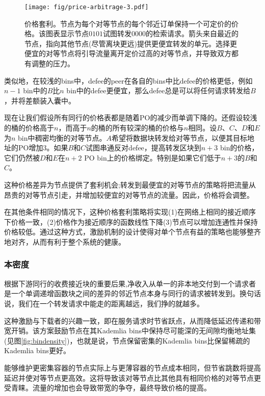 \begin{figure}[htbp]
   \centering
   \texttt{[image: fig/price-arbitrage-3.pdf]}
    \caption[价格套利\statusgreen]{价格套利。节点为每个对等节点的每个邻近订单保持一个可定价的价格。该图表显示节点$0101$试图转发$0000$的检索请求。箭头来自最近的节点，指向其他节点(尽管离块更远)提供更便宜转发的单元。选择更便宜的对等节点将引导流量离开定价过高的对等节点，并导致双方都有调整的压力。}
   \label{fig:price-arbitrage}
\end{figure}
 


类似地，在较浅的bins中，defee的peer在各自的bins中比defee的价格更低，例如$n-1$ bin中的$B$比$n$ bin中的defee更便宜，那么defee总是可以将任何请求转发给$B$，并将差额装入囊中。

现在让我们假设所有同行的价格表都是随着PO的减少而单调下降的。还假设较浅的桶的价格高于$n$，而高于$n$的桶的所有较深的桶的价格与$n$相同。设$B$、$C$、$D$和$E$为$n$ bin中稠密均衡的对等节点。$A$希望将数据块转发给对等节点，以便其目标地址的PO增加3。如果$B$和$C$试图串通反对defee，提高转发区块到$n+3$ bin的价格，它们仍然被$D$和$E$在$n+2$ PO bin上的价格绑定。特别是如果它们低于$n+3$的$B$和$C$。

这种价格差异为节点提供了套利机会;转发到最便宜的对等节点的策略将把流量从昂贵的对等节点引走，并增加较便宜的对等节点的流量。因此，价格将会调整。

在其他条件相同的情况下，这种价格套利策略将实现(1)在网络上相同的接近顺序下价格一致，(2)价格作为接近顺序的函数线性下降(3)节点可以增加连通性并保持价格较低。通过这种方式，激励机制的设计使得对单个节点有益的策略也能够整齐地对齐，从而有利于整个系统的健康。


\subsubsection{本密度}

根据下游同行的收费接近块的重要后果,净收入从单一的非本地交付到一个请求者是一个单调递增函数块之间的差异的邻近节点本身与同行的请求被转发到。换句话说，我们在一个转发请求中能走的距离越远，我们挣的就越多。

这种激励与下载者的兴趣一致，即在服务请求时节省跃点，从而降低延迟传递和带宽开销。该方案鼓励节点在其Kademlia bins中保持尽可能深的无间隙均衡地址集(见图\ref{fig:bindensity})，也就是说，节点保留密集的Kademlia bins比保留稀疏的Kademlia bins更好。


能够维护更密集容器的节点实际上与更薄容器的节点成本相同，但节省跳数将提高延迟并使对等节点更高效。这将导致该对等节点比其他具有相同价格的对等节点更受青睐。流量的增加也会导致带宽的争夺，最终导致价格的提高。

